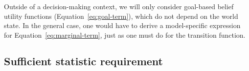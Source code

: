 

Outside of a decision-making context, we will only consider goal-based belief utility functions (Equation~\ref{eq:goal-term}), which do not depend on the world state. In the general case, one would have to derive a model-specific expression for Equation~\ref{eq:marginal-term}, just as one must do for the transition function.

\subsection{Sufficient statistic requirement}\label{sec:metamdp-sufficient}


